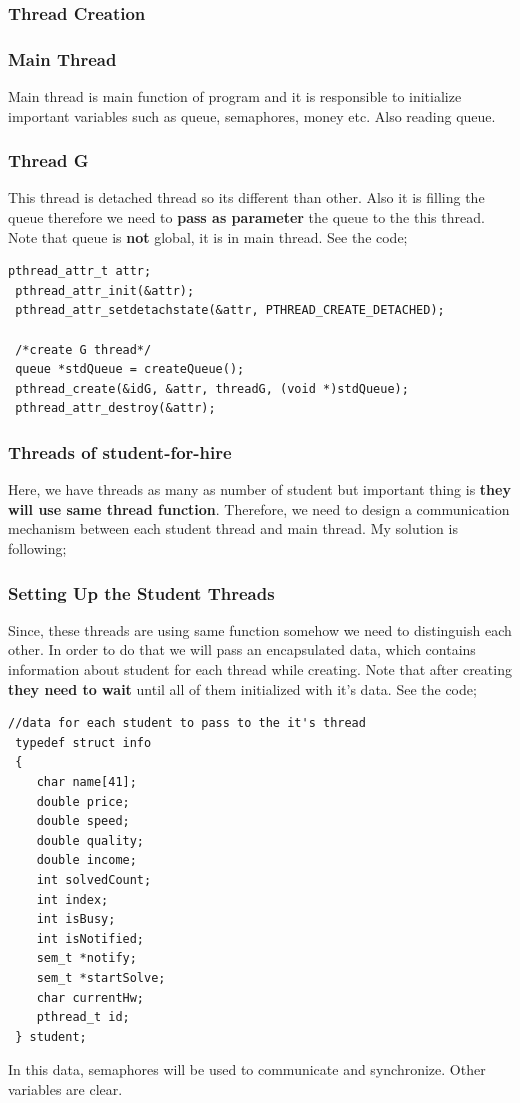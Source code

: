 \documentclass{article}
\begin{document}
\subsubsection{Thread Creation}
\subsubsection*{Main Thread}
Main thread is main function of program and it is responsible to initialize important variables such as queue, semaphores, money etc. Also reading queue.
\subsubsection*{Thread G}
This thread is detached thread so its different than other. Also it is filling the queue therefore we need to \textbf{pass as parameter} the queue
to the this thread. Note that queue is \textbf{not} global, it is in main thread. See the code;
\begin{lstlisting}[style=CStyle]
 pthread_attr_t attr;
 pthread_attr_init(&attr);
 pthread_attr_setdetachstate(&attr, PTHREAD_CREATE_DETACHED);

 /*create G thread*/
 queue *stdQueue = createQueue();
 pthread_create(&idG, &attr, threadG, (void *)stdQueue);
 pthread_attr_destroy(&attr);
\end{lstlisting}
\subsubsection*{Threads of student-for-hire}
Here, we have threads as many as number of student but important thing is \textbf{they will use same thread function}. Therefore, 
we need to design a communication mechanism between each student thread and main thread. My solution is following;
\subsubsection*{Setting Up the Student Threads}
Since, these threads are using same function somehow we need to distinguish each other. In order to do that we will pass an encapsulated data,
which contains information about student for each thread while creating. Note that after creating \textbf{they need to wait} until all of them
initialized with it's data. See the code;
\cleardoublepage
\begin{lstlisting}[style=CStyle]
 //data for each student to pass to the it's thread
 typedef struct info
 {
    char name[41];
    double price;
    double speed;
    double quality;
    double income;
    int solvedCount;
    int index;
    int isBusy;
    int isNotified;
    sem_t *notify;
    sem_t *startSolve;
    char currentHw;
    pthread_t id;
 } student;
\end{lstlisting}
In this data, semaphores will be used to communicate and synchronize. Other variables are clear.
\end{document}
